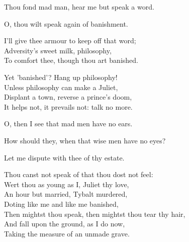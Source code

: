 \begin{speech}
Thou fond mad man, hear me but speak a word. \\

\end{speech}
\begin{speech}
O, thou wilt speak again of banishment. \\
\end{speech}
\begin{speech}
I'll give thee armour to keep off that word; \\

Adversity's sweet milk, philosophy, \\
To comfort thee, though thou art banished. \\
\end{speech}
\begin{speech}
Yet 'banished'?   Hang up philosophy! \\
Unless philosophy can make a Juliet, \\
Displant a town, reverse a prince's doom, \\
It helps not, it prevails not: talk no more. \\
\end{speech}
\begin{speech}
O, then I see that mad men have no ears. \\
\end{speech}
\begin{speech}
How should they, when that wise men have no eyes?
\\
\end{speech}
\begin{speech}
Let me dispute with thee of thy estate. \\
\end{speech}
\begin{speech}
Thou canst not speak of that thou dost not feel: \\

Wert thou as young as I, Juliet thy love, \\
An hour but married, Tybalt murdered, \\
Doting like me and like me banished, \\
Then mightst thou speak, then mightst thou
tear thy hair, \\
And fall upon the ground, as I do now, \\
Taking the measure of an unmade grave. 
\\
\end{speech}
